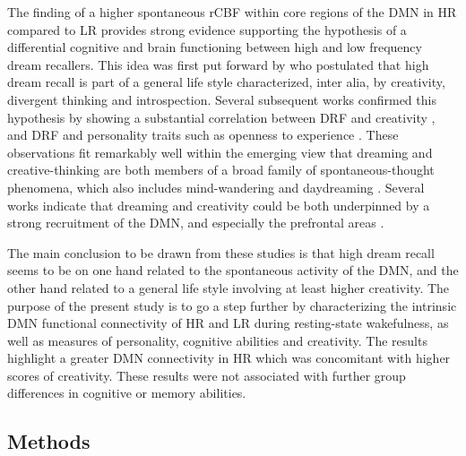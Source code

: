 The finding of a higher spontaneous rCBF within core regions of the DMN in HR compared to LR provides strong evidence supporting the hypothesis of a differential cognitive and brain functioning between high and low frequency dream recallers. This idea was first put forward by \citet{schonbar_differential_1965} who postulated that high dream recall is part of a general life style characterized, inter alia, by creativity, divergent thinking and introspection. Several subsequent works confirmed this hypothesis by showing a substantial correlation between DRF and creativity \citep{fitch_variations_1989, schredl_creativity_1995, schredl_factors_2003}, and DRF and personality traits such as openness to experience \citep{hartmann_boundaries_1989, schredl_dreaming_1996, schredl_dream_2003}. These observations fit remarkably well within the emerging view that dreaming and creative-thinking are both members of a broad family of spontaneous-thought phenomena, which also includes mind-wandering and daydreaming \citep{christoff_mind-wandering_2016}. Several works indicate that dreaming and creativity could be both underpinned by a strong recruitment of the DMN, and especially the prefrontal areas \citep{domhoff_neural_2011, ellamil_evaluative_2012, jung_structure_2013, beaty_creativity_2014, mok_interplay_2014, beaty_default_2015, christoff_mind-wandering_2016}.

The main conclusion to be drawn from these studies is that high dream recall seems to be on one hand related to the spontaneous activity of the DMN, and the other hand related to a general life style involving at least higher creativity. The purpose of the present study is to go a step further by characterizing the intrinsic DMN functional connectivity of HR and LR during resting-state wakefulness, as well as measures of personality, cognitive abilities and creativity. The results highlight a greater DMN connectivity in HR which was concomitant with higher scores of creativity. These results were not associated with further group differences in cognitive or memory abilities.

\subsection*{Methods}
\label{res:inertia:creativity:methods}

